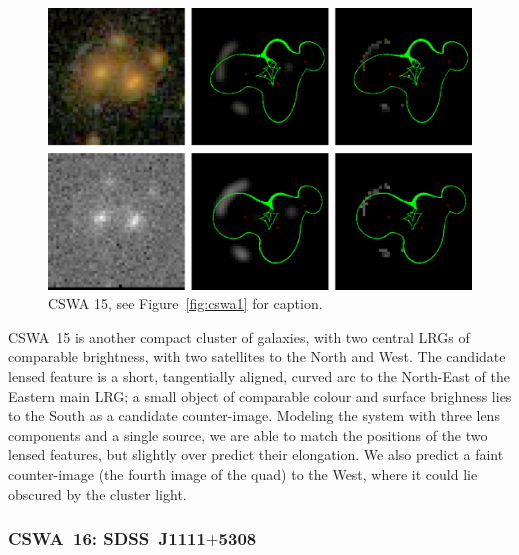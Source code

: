 \documentclass[iop]{emulateapj}
\begin{document}

\begin{figure}[!ht]
	\centering\includegraphics[width=\linewidth]{figs/15.eps}
	\caption{CSWA 15, see Figure~\ref{fig:cswa1} for caption.}
	\label{fig:cswa15}
\end{figure}

CSWA~15 is another compact cluster of galaxies, with two central LRGs of
comparable brightness, with two satellites to the North and West.  The candidate
lensed feature is a short, tangentially aligned, curved arc to the North-East of
the Eastern main LRG; a small object of comparable colour and surface brighness
lies to the South as a candidate counter-image.  Modeling the system with three
lens components and a single source, we are able to match the positions of the
two lensed features, but slightly over predict their elongation. We also predict
a faint counter-image (the fourth image of the quad) to the West, where it could
lie obscured by the cluster light. 



\subsubsection*{CSWA~16: SDSS\ J1111$+$5308}
\label{sec:results:indinotes:cswa16}

\end{document}
